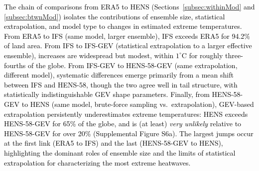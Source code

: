 \documentclass[draft]{agujournal2019}
\newcommand{\newTxt}{\textcolor{black}}
\begin{document}
\newTxt{
The chain of comparisons from ERA5 to HENS (Sections~\ref{subsec:withinMod} and \ref{subsec:btwnMod}) isolates the contributions of ensemble size, statistical extrapolation, and model type to changes in estimated extreme temperatures. From ERA5 to IFS (same model, larger ensemble), IFS exceeds ERA5 for 94.2\% of land area. From IFS to IFS-GEV (statistical extrapolation to a larger effective ensemble), increases are widespread but modest, within $1^\circ$C for roughly three-fourths of the globe. From IFS-GEV to HENS-58-GEV (same extrapolation, different model), systematic differences emerge primarily from a mean shift between IFS and HENS-58, though the two agree well in tail structure, with statistically indistinguishable GEV shape parameters. Finally, from HENS-58-GEV to HENS (same model, brute-force sampling vs.\ extrapolation), GEV-based extrapolation persistently underestimates extreme temperatures: HENS exceeds HENS-58-GEV for 65\% of the globe, and is (at least) \textit{very unlikely} relative to HENS-58-GEV for over 20\% (Supplemental Figure S6a). The largest jumps occur at the first link (ERA5 to IFS) and the last (HENS-58-GEV to HENS), highlighting the dominant roles of ensemble size and the limits of statistical extrapolation for characterizing the most extreme heatwaves.
}
\end{document}
